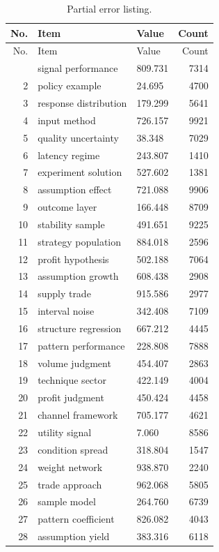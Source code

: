 \documentclass[11pt]{report}
\begin{document}
\begin{longtable}{rllr}\caption{Partial error listing.}\label{tab:l8}\\\toprule No. & Item & Value & Count \\ \midrule \endfirsthead\toprule No. & Item & Value & Count \\ \midrule \endhead\bottomrule \endfoot
1 & signal performance & 809.731 & 7314 \\
2 & policy example & 24.695 & 4700 \\
3 & response distribution & 179.299 & 5641 \\
4 & input method & 726.157 & 9921 \\
5 & quality uncertainty & 38.348 & 7029 \\
6 & latency regime & 243.807 & 1410 \\
7 & experiment solution & 527.602 & 1381 \\
8 & assumption effect & 721.088 & 9906 \\
9 & outcome layer & 166.448 & 8709 \\
10 & stability sample & 491.651 & 9225 \\
11 & strategy population & 884.018 & 2596 \\
12 & profit hypothesis & 502.188 & 7064 \\
13 & assumption growth & 608.438 & 2908 \\
14 & supply trade & 915.586 & 2977 \\
15 & interval noise & 342.408 & 7109 \\
16 & structure regression & 667.212 & 4445 \\
17 & pattern performance & 228.808 & 7888 \\
18 & volume judgment & 454.407 & 2863 \\
19 & technique sector & 422.149 & 4004 \\
20 & profit judgment & 450.424 & 4458 \\
21 & channel framework & 705.177 & 4621 \\
22 & utility signal & 7.060 & 8586 \\
23 & condition spread & 318.804 & 1547 \\
24 & weight network & 938.870 & 2240 \\
25 & trade approach & 962.068 & 5805 \\
26 & sample model & 264.760 & 6739 \\
27 & pattern coefficient & 826.082 & 4043 \\
28 & assumption yield & 383.316 & 6118 \\

\end{longtable}
\end{document}
